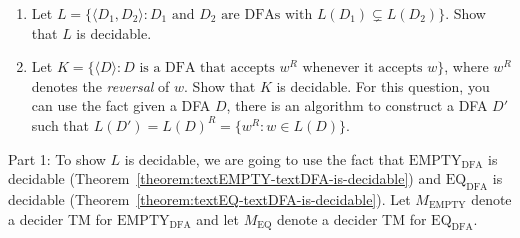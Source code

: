 \begin{flex}
\begin{exercise} \label{exercise:Practice-with-decidability-through-reductions} 
\begin{enumerate}
    \item Let $L = \{\langle D_1, D_2 \rangle: \text{$D_1$ and $D_2$ are DFAs with $L(D_1) \subsetneq L(D_2)$}\}$. Show that $L$ is decidable.
    \item Let $K = \{\langle D \rangle: \text{$D$ is a DFA that accepts $w^R$ whenever it accepts $w$}\}$, where $w^R$ denotes the \emph{reversal} of $w$. Show that $K$ is decidable. For this question, you can use the fact given a DFA $D$, there is an algorithm to construct a DFA $D'$ such that $L(D') = L(D)^R = \{w^R : w \in L(D)\}$.
\end{enumerate}
\end{exercise}


\begin{solution}
Part 1: To show $L$ is decidable, we are going to use the fact that $\mathrm{EMPTY}_\mathrm{DFA}$ is decidable (Theorem~\ref{theorem:textEMPTY-textDFA-is-decidable}) and $\mathrm{EQ}_\mathrm{DFA}$ is decidable (Theorem~\ref{theorem:textEQ-textDFA-is-decidable}). Let $M_\text{EMPTY}$ denote a decider TM for $\mathrm{EMPTY}_\mathrm{DFA}$ and let $M_\text{EQ}$ denote a decider TM for $\mathrm{EQ}_\mathrm{DFA}$.


\end{solution}
\end{flex}
